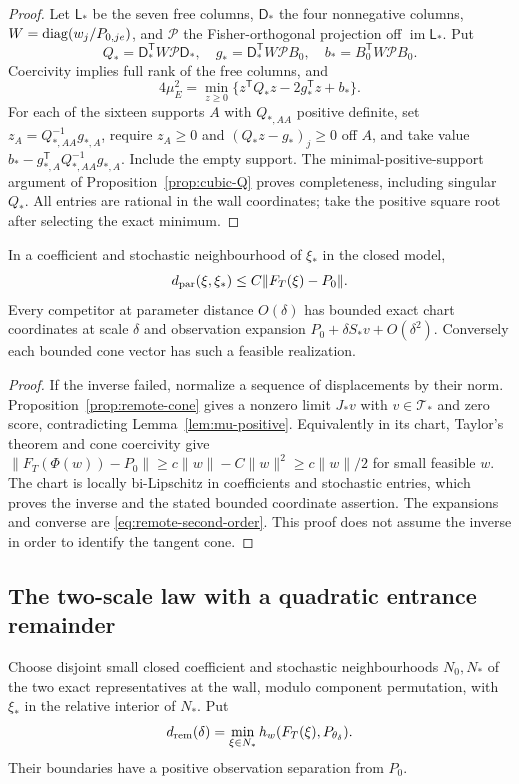 \begin{proof}
Let $\mathsf L_*$ be the seven free columns, $\mathsf D_*$ the four
nonnegative columns, $W=\operatorname{diag}(w_j/P_{0,je})$, and $\mathcal P$ the
Fisher-orthogonal projection off $\operatorname{im}\mathsf L_*$. Put
\[
 Q_*=\mathsf D_*^{\mathsf T}W\mathcal P\mathsf D_*,\quad
 g_*=\mathsf D_*^{\mathsf T}W\mathcal P B_0,\quad
 b_*=B_0^{\mathsf T}W\mathcal P B_0.
\]
Coercivity implies full rank of the free columns, and
\begin{equation}\label{eq:entrance-QP}
 4\mu_E^2=\min_{z\ge0}\{z^{\mathsf T}Q_*z-2g_*^{\mathsf T}z+b_*\}.
\end{equation}
For each of the sixteen supports $A$ with $Q_{*,AA}$ positive definite,
set $z_A=Q_{*,AA}^{-1}g_{*,A}$, require $z_A\ge0$ and
$(Q_*z-g_*)_j\ge0$ off $A$, and take value
$b_*-g_{*,A}^{\mathsf T}Q_{*,AA}^{-1}g_{*,A}$. Include the empty
support. The minimal-positive-support argument of
Proposition~\ref{prop:cubic-Q} proves completeness, including singular
$Q_*$. All entries are rational in the wall coordinates; take the
positive square root after selecting the exact minimum.
\end{proof}

\begin{lemma}\label{lem:remote-control}
In a coefficient and stochastic neighbourhood of $\xi_*$ in the closed
model,
\[
 d_{\rm par}(\xi,\xi_*)\le C\|F_T(\xi)-P_0\|.
\]
Every competitor at parameter distance $O(\delta)$ has bounded exact
chart coordinates at scale $\delta$ and observation expansion
$P_0+\delta S_*v+O(\delta^2)$. Conversely each bounded cone vector has
such a feasible realization.
\end{lemma}
\begin{proof}
If the inverse failed, normalize a sequence of displacements by their
norm. Proposition~\ref{prop:remote-cone} gives a nonzero limit $J_*v$
with $v\in\mathcal T_*$ and zero score, contradicting
Lemma~\ref{lem:mu-positive}. Equivalently in its chart, Taylor's theorem
and cone coercivity give
$\|F_T(\Phi(w))-P_0\|\ge c\|w\|-C\|w\|^2\ge c\|w\|/2$
for small feasible $w$. The chart is locally bi-Lipschitz in coefficients
and stochastic entries, which proves the inverse and the stated bounded
coordinate assertion. The expansions and converse are
\eqref{eq:remote-second-order}. This proof does not assume the inverse
in order to identify the tangent cone.
\end{proof}

\subsection{The two-scale law with a quadratic entrance remainder}
Choose disjoint small closed coefficient and stochastic neighbourhoods
$N_0,N_*$ of the two exact representatives at the wall, modulo component
permutation, with $\xi_*$ in the relative interior of $N_*$. Put
\begin{equation}\label{eq:drem}
 d_{\rm rem}(\delta)=\min_{\xi\in N_*}h_w(F_T(\xi),P_{\theta_\delta}).
\end{equation}
Their boundaries have a positive observation separation from $P_0$.

